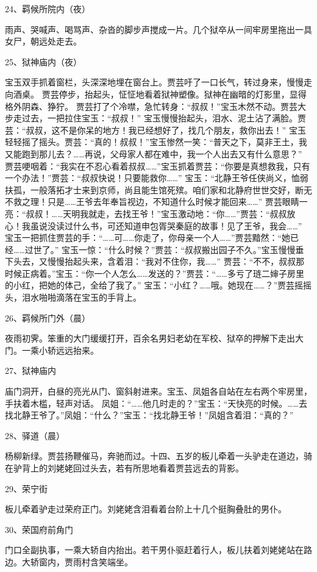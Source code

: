 24、羁候所院内（夜）\par
雨声、哭喊声、喝骂声、杂沓的脚步声搅成一片。几个狱卒从一间牢房里拖出一具女尸，朝远处走去。

25、狱神庙内（夜）\par
宝玉双手抓着窗栏，头深深地埋在窗台上。贾芸吁了一口长气，转过身来，慢慢走向酒桌。
贾芸停步，抬起头，怔怔地看着狱神塑像。狱神在幽暗的灯影里，显得格外阴森、狰狞。
贾芸打了个冷噤，急忙转身：“叔叔！”宝玉木然不动。贾芸大步走过去，一把拉住宝玉：“叔叔！”
宝玉慢慢抬起头，泪水、泥土沾了满脸。贾芸：“叔叔，这不是你呆的地方！我已经想好了，找几个朋友，救你出去！”
宝玉轻轻摇了摇头。贾芸：“真的！叔叔！”宝玉惨然一笑：“普天之下，莫非王土，我又能跑到那儿去？……再说，父母家人都在难中，我一个人出去又有什么意思？”
贾芸哽咽着：“我实在不忍心看着叔叔……”宝玉抓着贾芸：“你要是真想救我，只有一个办法！”贾芸：“叔叔快说！只要能救你……”
宝玉：“北静王爷任侠尚义，恤弱扶孤，一般落拓才士来到京师，尚且能生馆死殡。咱们家和北静府世世交好，断无不救之理！只是……王爷去年奉旨视边，不知道什么时候才能回来……”
贾芸眼睛一亮：“叔叔！……天明我就走，去找王爷！”宝玉激动地：“你……”贾芸：“叔叔放心！我虽说没读过什么书，可还知道申包胥哭秦庭的故事！见了王爷，我会……”
宝玉一把抓住贾芸的手：“……可……你走了，你母亲一个人……”贾芸黯然：“她已经……过世了。”
宝玉一惊：“什么时候？”贾芸：“叔叔搬出园子不久。”宝玉慢慢垂下头去，又慢慢抬起头来，含着泪：“我对不住你，我……”
贾芸：“不不，叔叔那时候正病着。”宝玉：“你一个人怎么……发送的？”贾芸：“……多亏了琏二婶子房里的小红，把她的体己，全给了我了。”
宝玉：“小红？……哦。她现在……？”贾芸摇摇头，泪水啪啪滴落在宝玉的手背上。

26、羁候所门外（晨）\par
夜雨初霁。笨重的大门缓缓打开，百余名男妇老幼在军校、狱卒的押解下走出大门。一乘小轿远远抬来。

27、狱神庙内\par
庙门洞开，白昼的亮光从门、窗斜射进来。宝玉、凤姐各自站在左右两个牢房里，手扶着木槛，轻声对话。
凤姐：“……他几时走的？”宝玉：“天快亮的时候。……去找北静王爷了。”凤姐：“什么？”宝玉：“找北静王爷！”凤姐含着泪：“真的？”

28、驿道（晨）\par
杨柳新绿。贾芸扬鞭催马，奔驰而过。十四、五岁的板儿牵着一头驴走在道边，骑在驴背上的刘姥姥回过头去，若有所思地看着贾芸远去的背影。

29、荣宁街\par
板儿牵着驴走过荣府正门。刘姥姥含泪看着台阶上十几个挺胸叠肚的男仆。

30、荣国府前角门\par
门口全副执事，一乘大轿自内抬出。若干男仆驱赶着行人，板儿扶着刘姥姥站在路边。大轿窗内，贾雨村含笑端坐。

